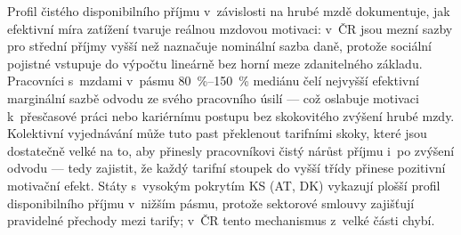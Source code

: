 Profil čistého disponibilního příjmu v~závislosti na hrubé mzdě dokumentuje, jak efektivní míra zatížení tvaruje reálnou mzdovou motivaci: v~ČR jsou mezní sazby pro střední příjmy vyšší než naznačuje nominální sazba daně, protože sociální pojistné vstupuje do výpočtu lineárně bez horní meze zdanitelného základu.
Pracovníci s~mzdami v~pásmu \SIrange{80}{150}{\percent} mediánu čelí nejvyšší efektivní marginální sazbě odvodu ze svého pracovního úsilí --- což oslabuje motivaci k~přesčasové práci nebo kariérnímu postupu bez skokovitého zvýšení hrubé mzdy.
Kolektivní vyjednávání může tuto past překlenout tarifními skoky, které jsou dostatečně velké na to, aby přinesly pracovníkovi čistý nárůst příjmu i~po zvýšení odvodu --- tedy zajistit, že každý tarifní stoupek do vyšší třídy přinese pozitivní motivační efekt.
Státy s~vysokým pokrytím \ac{KS} (AT, DK) vykazují plošší profil disponibilního příjmu v~nižším pásmu, protože sektorové smlouvy zajišťují pravidelné přechody mezi tarify; v~ČR tento mechanismus z~velké části chybí.


